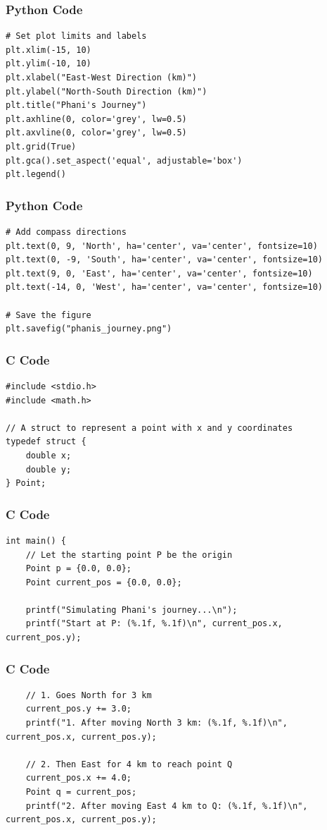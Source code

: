 \documentclass{beamer}
\begin{document}
\begin{frame}[fragile]
\frametitle{Python Code}
\begin{lstlisting}
# Set plot limits and labels
plt.xlim(-15, 10)
plt.ylim(-10, 10)
plt.xlabel("East-West Direction (km)")
plt.ylabel("North-South Direction (km)")
plt.title("Phani's Journey")
plt.axhline(0, color='grey', lw=0.5)
plt.axvline(0, color='grey', lw=0.5)
plt.grid(True)
plt.gca().set_aspect('equal', adjustable='box')
plt.legend()
\end{lstlisting}
\end{frame}

\begin{frame}[fragile]
\frametitle{Python Code}
\begin{lstlisting}
# Add compass directions
plt.text(0, 9, 'North', ha='center', va='center', fontsize=10)
plt.text(0, -9, 'South', ha='center', va='center', fontsize=10)
plt.text(9, 0, 'East', ha='center', va='center', fontsize=10)
plt.text(-14, 0, 'West', ha='center', va='center', fontsize=10)

# Save the figure
plt.savefig("phanis_journey.png")
\end{lstlisting}
\end{frame}

\begin{frame}[fragile]
\frametitle{C Code}
\begin{lstlisting}
#include <stdio.h>
#include <math.h>

// A struct to represent a point with x and y coordinates
typedef struct {
    double x;
    double y;
} Point;
\end{lstlisting}
\end{frame}

\begin{frame}[fragile]
\frametitle{C Code}
\begin{lstlisting}
int main() {
    // Let the starting point P be the origin
    Point p = {0.0, 0.0};
    Point current_pos = {0.0, 0.0};

    printf("Simulating Phani's journey...\n");
    printf("Start at P: (%.1f, %.1f)\n", current_pos.x, current_pos.y);
\end{lstlisting}
\end{frame}

\begin{frame}[fragile]
\frametitle{C Code}
\begin{lstlisting}
    // 1. Goes North for 3 km
    current_pos.y += 3.0;
    printf("1. After moving North 3 km: (%.1f, %.1f)\n", current_pos.x, current_pos.y);

    // 2. Then East for 4 km to reach point Q
    current_pos.x += 4.0;
    Point q = current_pos;
    printf("2. After moving East 4 km to Q: (%.1f, %.1f)\n", current_pos.x, current_pos.y);
\end{lstlisting}
\end{frame}
\end{document}
